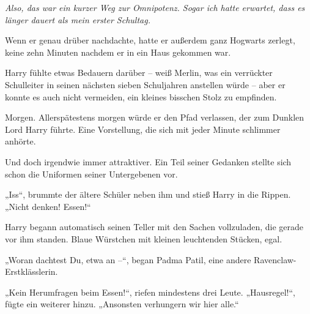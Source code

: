 \emph{Also, das war ein kurzer Weg zur Omnipotenz. Sogar ich hatte erwartet, dass es länger dauert als mein erster Schultag.}

Wenn er genau drüber nachdachte, hatte er außerdem ganz Hogwarts zerlegt, keine zehn Minuten nachdem er in ein Haus gekommen war.

Harry fühlte etwas Bedauern darüber – weiß Merlin, was ein verrückter Schulleiter in seinen nächsten sieben Schuljahren anstellen würde – aber er konnte es auch nicht vermeiden, ein kleines bisschen Stolz zu empfinden.

Morgen. Allerspätestens morgen würde er den Pfad verlassen, der zum Dunklen Lord Harry führte. Eine Vorstellung, die sich mit jeder Minute schlimmer anhörte.

Und doch irgendwie immer attraktiver. Ein Teil seiner Gedanken stellte sich schon die Uniformen seiner Untergebenen vor.

„Iss“, brummte der ältere Schüler neben ihm und stieß Harry in die Rippen. „Nicht denken! Essen!“

Harry begann automatisch seinen Teller mit den Sachen vollzuladen, die gerade vor ihm standen. Blaue Würstchen mit kleinen leuchtenden Stücken, egal.

„Woran dachtest Du, etwa an –“, began Padma Patil, eine andere Ravenclaw-Erstklässlerin.

„Kein Herumfragen beim Essen!“, riefen mindestens drei Leute. „Hausregel!“, fügte ein weiterer hinzu. „Ansonsten verhungern wir hier alle.“

